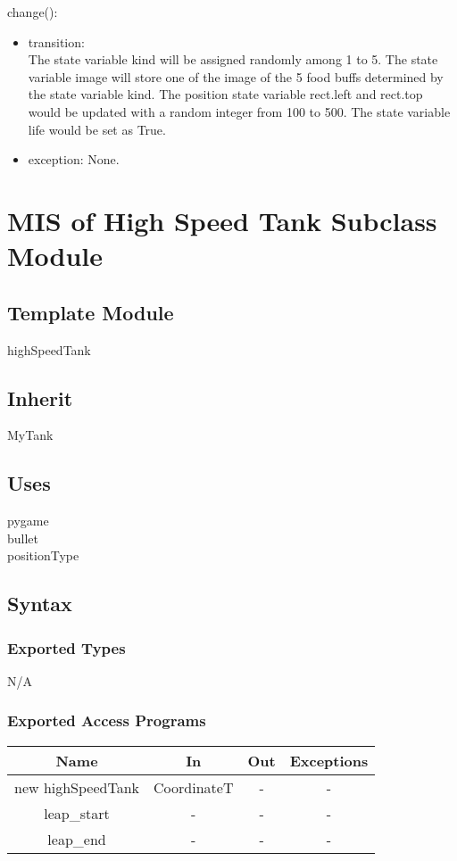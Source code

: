 \documentclass[12pt, titlepage]{article}
\begin{document}
        change():
		\begin{itemize}
		\item transition: \\
		The state variable kind will be assigned randomly among 1 to 5. The state variable image will store one of the image of the 5 food buffs determined by the state variable kind. The position state variable rect.left and rect.top would be updated with a random integer from 100 to 500. The state variable life would be set as True.
		
		\item exception: None.
        \end{itemize}
        
        
\section{MIS of High Speed Tank Subclass Module}
        \subsection{Template Module}
        highSpeedTank
        
        \subsection{Inherit}
        MyTank
        
        \subsection{Uses}
        pygame\\
        bullet\\
        positionType
        
		\subsection{Syntax}
		\subsubsection{Exported Types}
		N/A
		\subsubsection{Exported Access Programs}
	\begin{tabular}[pos]{|c|c|c|c|}
	\hline
	\textbf{Name}& \textbf{In} & \textbf{Out} & \textbf{Exceptions} \\ 
	\hline
	new highSpeedTank & CoordinateT & - & -\\ 
	\hline
	leap\_start & - & - & -\\ 
	\hline
	leap\_end & - & - & -\\ 
	\hline
					
	\end{tabular}			
		
\end{document}

